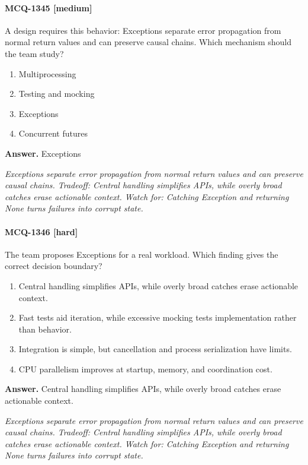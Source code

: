 \paragraph{MCQ-1345 [medium]} A design requires this behavior: Exceptions separate error propagation from normal return values and can preserve causal chains. Which mechanism should the team study?
\begin{enumerate}[label=\Alph*.]
\item Multiprocessing
\item Testing and mocking
\item Exceptions
\item Concurrent futures
\end{enumerate}
\noindent\textbf{Answer.} Exceptions
\par\textit{Exceptions separate error propagation from normal return values and can preserve causal chains. Tradeoff: Central handling simplifies APIs, while overly broad catches erase actionable context. Watch for: Catching Exception and returning None turns failures into corrupt state.}
\paragraph{MCQ-1346 [hard]} The team proposes Exceptions for a real workload. Which finding gives the correct decision boundary?
\begin{enumerate}[label=\Alph*.]
\item Central handling simplifies APIs, while overly broad catches erase actionable context.
\item Fast tests aid iteration, while excessive mocking tests implementation rather than behavior.
\item Integration is simple, but cancellation and process serialization have limits.
\item CPU parallelism improves at startup, memory, and coordination cost.
\end{enumerate}
\noindent\textbf{Answer.} Central handling simplifies APIs, while overly broad catches erase actionable context.
\par\textit{Exceptions separate error propagation from normal return values and can preserve causal chains. Tradeoff: Central handling simplifies APIs, while overly broad catches erase actionable context. Watch for: Catching Exception and returning None turns failures into corrupt state.}
